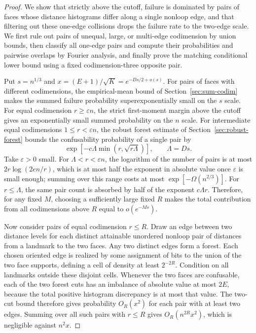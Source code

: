 \begin{proof}
We show that strictly above the cutoff, failure is dominated by pairs of faces
whose distance histograms differ along a single nonloop edge, and that
filtering out these one-edge collisions drops the failure rate to the two-edge
scale. We first rule out pairs of unequal, large, or multi-edge codimension
by union bounds, then classify all one-edge pairs and compute their
probabilities and pairwise overlaps by Fourier analysis, and finally prove the
matching conditional lower bound using a fixed codimension-three opposite pair.

Put \(s=n^{1/3}\) and \(x=(E+1)/\sqrt K=e^{-Ds/2+o(s)}\).
For pairs of faces with different codimensions, the empirical-mean bound of
Section~\ref{sec:sum-codim} makes the summed failure probability
superexponentially small on the \(s\) scale.
For equal codimension \(r\ge\varepsilon n\), the strict first-moment margin
above the cutoff gives an exponentially small summed probability on the \(n\)
scale.
For intermediate equal codimensions \(1\le r<\varepsilon n\), the robust forest
estimate of Section~\ref{sec:robust-forest} bounds the confusability
probability of a single pair by
\[
 \exp[-c\Lambda\min(r,\sqrt{r\Lambda})],\qquad \Lambda=Ds .
\]
Take \(\varepsilon>0\) small. For \(\Lambda<r<\varepsilon n\), the logarithm
of the number of pairs is at most \(2r\log(2en/r)\), which is at most half the
exponent in absolute value once \(\varepsilon\) is small enough; summing over
this range costs at most \(\exp[-\Omega(n^{2/3})]\). For \(r\le \Lambda\), the
same pair count is absorbed by half of the exponent \(c\Lambda r\). Therefore,
for any fixed \(M\), choosing a sufficiently large fixed \(R\) makes the total
contribution from all codimensions above \(R\) equal to \(o(e^{-Ms})\).

Now consider pairs of equal codimension \(r\le R\). Draw an edge between two
distance levels for each distinct attainable unordered nonloop pair of
distances from a landmark to the two faces. Any two distinct edges form a
forest. Each chosen oriented edge is realized by some assignment of bits to the
union of the two face supports, defining a cell of density at least
\(2^{-2R}\). Condition on all landmarks outside these disjoint cells. Whenever
the two faces are confusable, each of the two forest cuts has an imbalance of
absolute value at most \(2E\), because the total positive histogram discrepancy
is at most that value. The two-cut bound therefore gives probability
\(O_R(x^2)\) for each pair with at least two edges. Summing over all such pairs
with \(r\le R\) gives \(O_R(n^{2R}x^2)\), which is negligible against \(n^2x\).


\end{proof}
